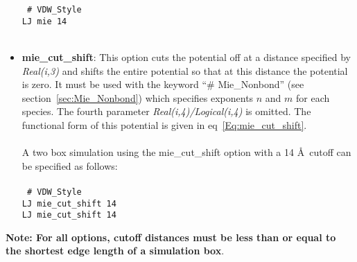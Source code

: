 \begin{itemize}
%
\texttt{
\# VDW\_Style \\
LJ mie 14 } \\ \\
%
\item \textbf{mie\_cut\_shift}: This option cuts the potential off at a distance
specified by \emph{Real(i,3)} and shifts the entire potential so that
at this distance the potential is zero. It must be used with the keyword ``\# Mie\_Nonbond'' (see section~\ref{sec:Mie_Nonbond}) which specifies exponents $n$ and $m$ for each species. The fourth parameter
\emph{Real(i,4)/Logical(i,4)} is omitted. The functional form of this
potential is given in eq~\ref{Eq:mie_cut_shift}. \\ \\ 
%
A two box simulation using the mie\_cut\_shift option with a 14 \AA\ cutoff can be specified as follows:
\\ \\
\texttt{
\# VDW\_Style \\
LJ mie\_cut\_shift 14 \\
LJ mie\_cut\_shift 14 } \\ 
%
\end{itemize}
{\bf Note: For all options, cutoff distances must be less than or
  equal to the shortest edge length of a simulation box}.
%
%
